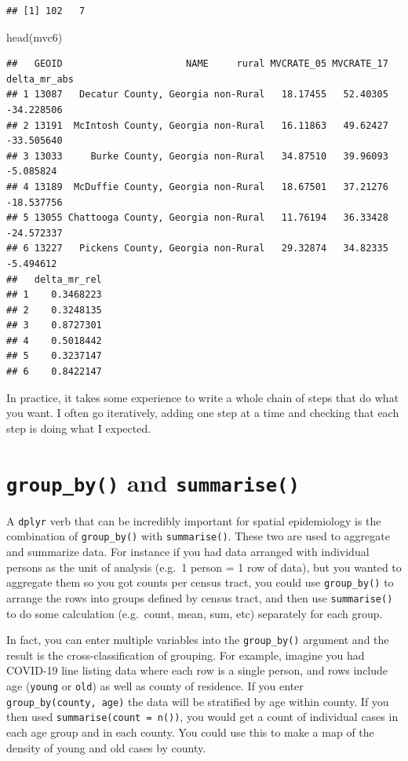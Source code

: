 \documentclass[
]{book}
\newenvironment{Shaded}{\begin{snugshade}}{\end{snugshade}}
\newcommand{\FunctionTok}[1]{\textcolor[rgb]{0.00,0.00,0.00}{#1}}
\newcommand{\NormalTok}[1]{#1}
\begin{document}
\begin{verbatim}
## [1] 102   7
\end{verbatim}

\begin{Shaded}
\begin{Highlighting}[]
\FunctionTok{head}\NormalTok{(mvc6)}
\end{Highlighting}
\end{Shaded}

\begin{verbatim}
##   GEOID                      NAME     rural MVCRATE_05 MVCRATE_17 delta_mr_abs
## 1 13087   Decatur County, Georgia non-Rural   18.17455   52.40305   -34.228506
## 2 13191  McIntosh County, Georgia non-Rural   16.11863   49.62427   -33.505640
## 3 13033     Burke County, Georgia non-Rural   34.87510   39.96093    -5.085824
## 4 13189  McDuffie County, Georgia non-Rural   18.67501   37.21276   -18.537756
## 5 13055 Chattooga County, Georgia non-Rural   11.76194   36.33428   -24.572337
## 6 13227   Pickens County, Georgia non-Rural   29.32874   34.82335    -5.494612
##   delta_mr_rel
## 1    0.3468223
## 2    0.3248135
## 3    0.8727301
## 4    0.5018442
## 5    0.3237147
## 6    0.8422147
\end{verbatim}

In practice, it takes some experience to write a whole chain of steps that do what you want. I often go iteratively, adding one step at a time and checking that each step is doing what I expected.

\hypertarget{group_by-and-summarise}{%
\section{\texorpdfstring{\texttt{group\_by()} and \texttt{summarise()}}{group\_by() and summarise()}}\label{group_by-and-summarise}}

A \texttt{dplyr} verb that can be incredibly important for spatial epidemiology is the combination of \texttt{group\_by()} with \texttt{summarise()}. These two are used to aggregate and summarize data. For instance if you had data arranged with individual persons as the unit of analysis (e.g.~1 person = 1 row of data), but you wanted to aggregate them so you got counts per census tract, you could use \texttt{group\_by()} to arrange the rows into groups defined by census tract, and then use \texttt{summarise()} to do some calculation (e.g.~count, mean, sum, etc) separately for each group.

In fact, you can enter multiple variables into the \texttt{group\_by()} argument and the result is the cross-classification of grouping. For example, imagine you had COVID-19 line listing data where each row is a single person, and rows include age (\texttt{young} or \texttt{old}) as well as county of residence. If you enter \texttt{group\_by(county,\ age)} the data will be stratified by age within county. If you then used \texttt{summarise(count\ =\ n())}, you would get a count of individual cases in each age group and in each county. You could use this to make a map of the density of young and old cases by county.
\end{document}
